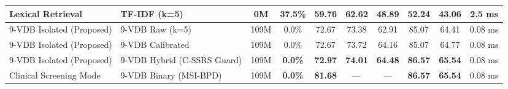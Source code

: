 \begin{table}[t]
\begin{tabular}{llcccccccc}
Lexical Retrieval & TF-IDF (k=5) & 0M & 37.5\% & 59.76 & 62.62 & 48.89 & 52.24 & 43.06 & 2.5 ms \\
\hline
9-VDB Isolated (Proposed) & 9-VDB Raw (k=5) & 109M & 0.0\% & 72.67 & 73.38 & 62.91 & 85.07 & 64.41 & 0.08 ms \\
9-VDB Isolated (Proposed) & 9-VDB Calibrated & 109M & 0.0\% & 72.67 & 73.72 & 64.16 & 85.07 & 64.77 & 0.08 ms \\
9-VDB Isolated (Proposed) & 9-VDB Hybrid (C-SSRS Guard) & 109M & \textbf{0.0\%} & \textbf{72.97} & \textbf{74.01} & \textbf{64.48} & \textbf{86.57} & \textbf{65.54} & 0.08 ms \\
\hline
Clinical Screening Mode & 9-VDB Binary (MSI-BPD) & 109M & \textbf{0.0\%} & \textbf{81.68} & --- & --- & \textbf{86.57} & \textbf{65.54} & 0.08 ms \\
\hline
\end{tabular}
\end{table}